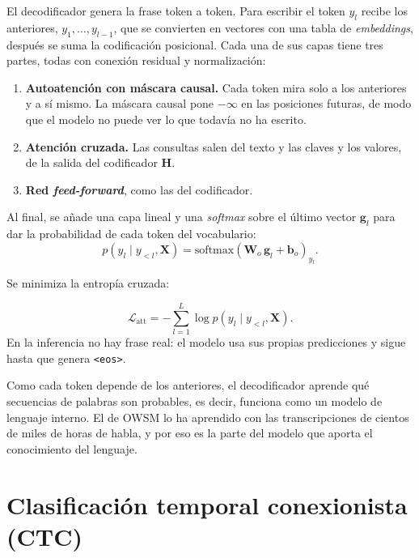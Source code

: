 El decodificador genera la frase token a token. Para escribir el token $y_l$ recibe los anteriores, $y_1, \dots, y_{l-1}$, que se convierten en vectores con una tabla de \textit{embeddings}, después se suma la codificación posicional. Cada una de sus capas tiene tres partes, todas con conexión residual y normalización:

\begin{enumerate}[leftmargin=*, itemsep=0.3em]
  \item \textbf{Autoatención con máscara causal.} Cada token mira solo a los anteriores y a sí mismo. La máscara causal pone $-\infty$ en las posiciones futuras, de modo que el modelo no puede ver lo que todavía no ha escrito.
  \item \textbf{Atención cruzada.} Las consultas salen del texto y las claves y los valores, de la salida del codificador $\mathbf{H}$. 
  \item \textbf{Red \textit{feed-forward}}, como las del codificador.
\end{enumerate}

Al final, se añade una capa lineal y una \textit{softmax} sobre el último vector $\mathbf{g}_l$ para dar la probabilidad de cada token del vocabulario:
\begin{equation}
  p(y_l \mid y_{<l}, \mathbf{X}) = \mathrm{softmax}\left( \mathbf{W}_o\,\mathbf{g}_l + \mathbf{b}_o \right)_{y_l}.
  \label{eq:decoder}
\end{equation}

Se minimiza la entropía cruzada:

\begin{equation}
  \mathcal{L}_{\mathrm{att}} = -\sum_{l=1}^{L} \log p(y_l \mid y_{<l}, \mathbf{X}).
  \label{eq:loss-att}
\end{equation}
En la inferencia no hay frase real: el modelo usa sus propias predicciones y sigue hasta que genera \texttt{<eos>}.

Como cada token depende de los anteriores, el decodificador aprende qué secuencias de palabras son probables, es decir, funciona como un modelo de lenguaje interno. El de OWSM lo ha aprendido con las transcripciones de cientos de miles de horas de habla, y por eso es la parte del modelo que aporta el conocimiento del lenguaje.

\section{Clasificación temporal conexionista (CTC)}
\label{sec:ctc}

